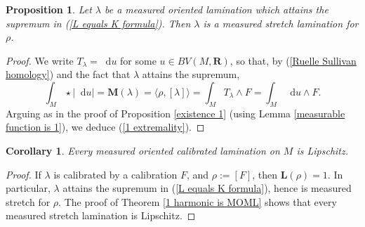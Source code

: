 \documentclass[reqno,11pt]{amsart}
\newcommand{\RR}{\mathbf{R}}
\newcommand*\dif{\mathop{}\!\mathrm{d}}
\newcommand{\Mass}{\mathbf M}
\newcommand{\Comass}{\mathbf L}
\newtheorem{proposition}[theorem]{Proposition}
\newtheorem{corollary}[theorem]{Corollary}
\theoremstyle{definition}
\numberwithin{equation}{section}
\begin{document}
\begin{proposition}\label{calibrated means measured stretch}
Let $\lambda$ be a measured oriented lamination which attains the supremum in (\ref{L equals K formula}).
Then $\lambda$ is a measured stretch lamination for $\rho$.
\end{proposition}
\begin{proof}
We write $T_\lambda = \dif u$ for some $u \in BV(M, \RR)$, so that, by (\ref{Ruelle Sullivan homology}) and the fact that $\lambda$ attains the supremum,
$$\int_M \star |\dif u| = \Mass(\lambda) = \langle \rho, [\lambda]\rangle = \int_M T_\lambda \wedge F = \int_M \dif u \wedge F.$$
Arguing as in the proof of Proposition \ref{existence 1} (using Lemma \ref{measurable function is 1}), we deduce (\ref{1 extremality}).
\end{proof}

\begin{corollary}
Every measured oriented calibrated lamination on $M$ is Lipschitz.
\end{corollary}
\begin{proof}
If $\lambda$ is calibrated by a calibration $F$, and $\rho := [F]$, then $\Comass(\rho) = 1$.
In particular, $\lambda$ attains the supremum in (\ref{L equals K formula}), hence is measured stretch for $\rho$.
The proof of Theorem \ref{1 harmonic is MOML} shows that every measured stretch lamination is Lipschitz.
\end{proof}


\end{document}
